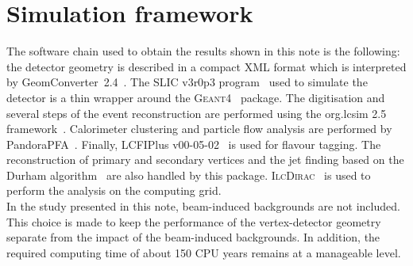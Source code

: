 \section{Simulation framework}\label{sec:Framework}

The software chain used to obtain the results shown in this note is the following: the detector geometry is described in a compact XML format which is interpreted by GeomConverter~2.4~\cite{GeomConverter-homepage}. The SLIC v3r0p3 program~\cite{Graf:2006ei} used to simulate the detector is a thin wrapper around the \textsc{Geant4}~\cite{Agostinelli2003250} package. The digitisation and several steps of the event reconstruction are performed using the org.lcsim 2.5 framework~\cite{lcsim-homepage}. Calorimeter clustering and particle flow analysis are performed by PandoraPFA~\cite{Thomson:2009rp, Marshall:2012ry}. Finally, LCFIPlus v00-05-02~\cite{website:LCFIPlus} is used for flavour tagging. The reconstruction of primary and secondary vertices and the jet finding based on the Durham algorithm~\cite{Catani:1991hj} are also handled by this package. \textsc{IlcDirac}~\cite{ilcdirac} is used to perform the analysis on the computing grid. \\
In the study presented in this note, beam-induced backgrounds are not included. This choice is made to keep the performance of the vertex-detector geometry separate from the impact of the beam-induced backgrounds. In addition, the required computing time of about 150 CPU years remains at a manageable level. 

